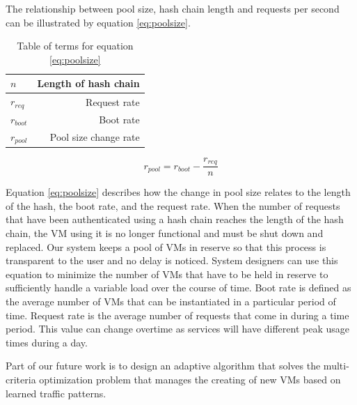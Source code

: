 \documentclass[a4paper,twoside]{article}
\begin{document}
The relationship between pool size, hash chain length and requests per second can be illustrated by equation \ref{eq:poolsize}.  

\begin{table}
	

\begin{center}
	\begin{tabular}{ | l | r |}
		\hline
		$n$ & Length of hash chain \\ \hline 
		$r_{req}$ & Request rate  \\ \hline
		$r_{boot}$ & Boot rate  \\ \hline
		$r_{pool}$ & Pool size change rate\\
		\hline
		
	\end{tabular}
	
	\label{tab:terms}
\end{center}
\caption{Table of terms for equation \ref{eq:poolsize}}
\end{table}

\begin{equation} 
 r_{pool} = r_{boot} - \frac{r_{req}}{n}
 \label{eq:poolsize}
\end{equation}


Equation \ref{eq:poolsize} describes how the change in pool size relates to the length of the hash, the boot rate, and the request rate.   When the number of requests that have been authenticated using a hash chain reaches the length of the hash chain, the VM using it is no longer functional and must be shut down and replaced.  Our system keeps a pool of VMs in reserve so that this process is transparent to the user and no delay is noticed.  System designers can use this equation to minimize the number of VMs that have to be held in reserve to sufficiently handle a variable load over the course of time.  Boot rate is defined as the average number of VMs that can be instantiated in a particular period of time.  Request rate is the average number of requests that come in during a time period.  This value can change overtime as services will have different peak usage times during a day.  


Part of our future work is to design an adaptive algorithm that solves the multi-criteria optimization problem that manages the creating of new VMs based on learned traffic patterns.
\end{document}
